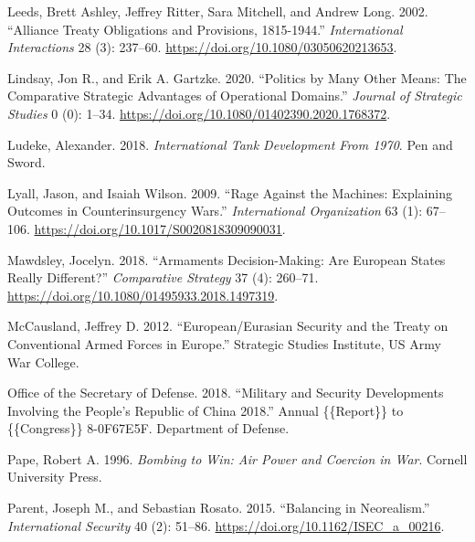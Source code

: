 \documentclass[
]{article}
\newlength{\cslhangindent}
\newlength{\cslentryspacingunit} %
\newenvironment{CSLReferences}[2] %
 {%
  \setlength{\parindent}{0pt}
  \ifodd #1
  \let\oldpar\par
  \def\par{\hangindent=\cslhangindent\oldpar}
  \fi
  \setlength{\parskip}{#2\cslentryspacingunit}
 }%
 {}
\begin{document}
\begin{CSLReferences}{1}{0}
\leavevmode{}%
Leeds, Brett Ashley, Jeffrey Ritter, Sara Mitchell, and Andrew Long. 2002. {``Alliance {Treaty Obligations} and {Provisions}, 1815-1944.''} \emph{International Interactions} 28 (3): 237--60. \url{https://doi.org/10.1080/03050620213653}.

\leavevmode{}%
Lindsay, Jon R., and Erik A. Gartzke. 2020. {``Politics by Many Other Means: {The} Comparative Strategic Advantages of Operational Domains.''} \emph{Journal of Strategic Studies} 0 (0): 1--34. \url{https://doi.org/10.1080/01402390.2020.1768372}.

\leavevmode{}%
Ludeke, Alexander. 2018. \emph{International {Tank Development From} 1970}. {Pen and Sword}.

\leavevmode{}%
Lyall, Jason, and Isaiah Wilson. 2009. {``Rage {Against} the {Machines}: {Explaining Outcomes} in {Counterinsurgency Wars}.''} \emph{International Organization} 63 (1): 67--106. \url{https://doi.org/10.1017/S0020818309090031}.

\leavevmode{}%
Mawdsley, Jocelyn. 2018. {``Armaments Decision-Making: {Are European} States Really Different?''} \emph{Comparative Strategy} 37 (4): 260--71. \url{https://doi.org/10.1080/01495933.2018.1497319}.

\leavevmode{}%
McCausland, Jeffrey D. 2012. {``European/{Eurasian Security} and the {Treaty} on {Conventional Armed Forces} in {Europe}.''} {Strategic Studies Institute, US Army War College}.

\leavevmode{}%
Office of the Secretary of Defense. 2018. {``Military and {Security Developments Involving} the {People}'s {Republic} of {China} 2018.''} Annual \{\{Report\}\} to \{\{Congress\}\} 8-0F67E5F. {Department of Defense}.

\leavevmode{}%
Pape, Robert A. 1996. \emph{Bombing to {Win}: {Air Power} and {Coercion} in {War}}. {Cornell University Press}.

\leavevmode{}%
Parent, Joseph M., and Sebastian Rosato. 2015. {``Balancing in {Neorealism}.''} \emph{International Security} 40 (2): 51--86. \url{https://doi.org/10.1162/ISEC_a_00216}.


\end{CSLReferences}
\end{document}
